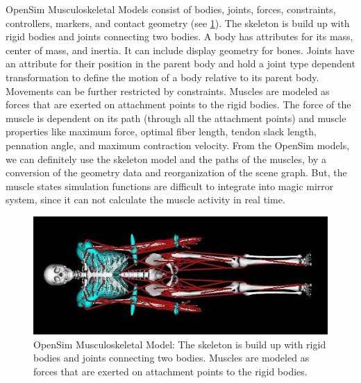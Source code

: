 OpenSim Musculoskeletal Models consist of bodies, joints, forces, constraints, controllers, markers, and contact geometry (see \figurename{\ref{fig:3-IMR:openSimModel}}). The skeleton is build up with rigid bodies and joints connecting two bodies. A body has attributes for its mass, center of mass, and inertia. It can include display geometry for bones. Joints have an attribute for their position in the parent body and hold a joint type dependent transformation to define the motion of a body relative to its parent body. Movements can be further restricted by constraints. Muscles are modeled as forces that are exerted on attachment points to the rigid bodies. The force of the muscle is dependent on its path (through all the attachment points) and muscle properties like maximum force, optimal fiber length, tendon slack length, pennation angle, and maximum contraction velocity. 
From the OpenSim models, we can definitely use the skeleton model and the paths of the muscles, by a conversion of the geometry data and reorganization of the scene graph. But, the muscle states simulation functions are difficult to integrate into magic mirror system, since it can not calculate the muscle activity in real time.
\begin{figure}
	\centering
	\includegraphics[width=0.8\linewidth]{figures/3-IMR/openSimModel.png}
	\caption{OpenSim Musculoskeletal Model: The skeleton is build up with rigid bodies and joints connecting two bodies. Muscles are modeled as forces that are exerted on attachment points to the rigid bodies. }
	\label{fig:3-IMR:openSimModel}
\end{figure}


